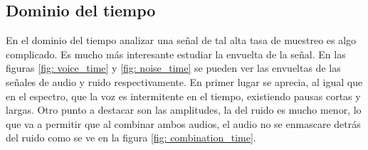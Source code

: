 \subsection{Dominio del tiempo}
En el dominio del tiempo analizar una señal de tal alta tasa de muestreo es algo complicado. Es mucho más interesante estudiar la envuelta de la señal. En las figuras \ref{fig: voice_time} y \ref{fig: noise_time} se pueden ver las envueltas de las señales de audio y ruido respectivamente. En primer lugar se aprecia, al igual que en el espectro, que la voz es intermitente en el tiempo, existiendo pausas cortas y largas. Otro punto a destacar son las amplitudes, la del ruido es mucho menor, lo que va a permitir que al combinar ambos audios, el audio no se enmascare detrás del ruido como se ve en la figura \ref{fig: combination_time}.

